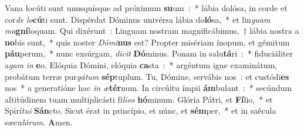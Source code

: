 Vana locúti sunt unusquísque ad próximum \textbf{su}um~:~* lábia dolósa, in corde et cor\textit{de} \textit{lo}\textbf{cú}ti sunt.
Dispérdat Dóminus univérsa lábia do\textbf{ló}sa,~* et lin\textit{guam} \textit{ma}\textbf{gní}loquam.
Qui dixérunt~: Linguam nostram magnificábimus,~† lábia nostra a \textbf{no}bis sunt,~* quis noster \textit{Dó}\textit{mi}\textbf{nus} est?
Propter misériam ínopum, et gémitum \textbf{páu}perum,~* nunc exsúrgam, \textit{di}\textit{cit} \textbf{Dó}minus.
Ponam in salu\textbf{tá}ri~:~* fiduciáliter a\textit{gam} \textit{in} \textbf{e}o.
Elóquia Dómini, elóquia \textbf{ca}sta~:~* argéntum igne examinátum, probátum terræ pur\textit{gá}\textit{tum} \textbf{sép}tuplum.
Tu, Dómine, servábis nos~: et custódi\textbf{es} nos~* a generatióne hac \textit{in} \textit{æ}\textbf{tér}num.
In circúitu ímpii \textbf{ám}bulant~:~* secúndum altitúdinem tuam multiplicásti fí\textit{li}\textit{os} \textbf{hó}minum.
Glória Pátri, et \textbf{Fí}lio,~* et Spirí\textit{tu}\textit{i} \textbf{Sán}cto.
Sicut érat in princípio, et núnc, et \textbf{sém}per,~* et in saécula sæcu\textit{ló}\textit{rum}. \textbf{A}men.
